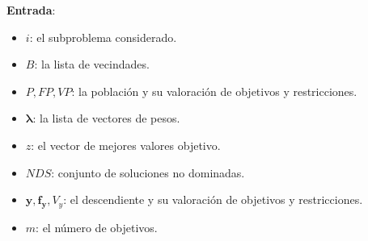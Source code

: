 \begin{center}
\begin{minipage}[H]{0.8\linewidth}
    \begin{algorithm}[H]
\SetAlgoLined
 \textbf{Entrada}:
 \begin{itemize}
 
     \vspace{0.15cm} \item $i$: el subproblema considerado.
     \vspace{0.15cm} \item $B$: la lista de vecindades. 
     \vspace{0.15cm} \item $P, FP, VP$: la población y su valoración de objetivos y restricciones.
     \vspace{0.15cm} \item $\boldsymbol{\lambda}$: la lista de vectores de pesos.
     \vspace{0.15cm} \item $z$: el vector de mejores valores objetivo.
     \vspace{0.15cm} \item $NDS$: conjunto de soluciones no dominadas.
     \vspace{0.15cm} \item $\boldsymbol{y},\boldsymbol{f_y}, V_y$: el descendiente y su valoración de objetivos y restricciones.
     \vspace{0.15cm} \item $m$: el número de objetivos.
 \end{itemize}
 
 \vspace{0.3cm}
  

\end{algorithm}
\end{minipage}
\end{center}
